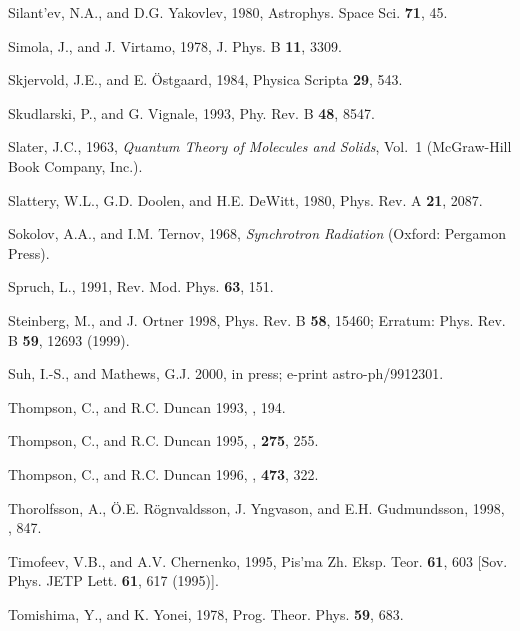 \begin{references}

\harvarditem{}{}{}
Silant'ev, N.A., and D.G. Yakovlev, 1980, Astrophys. Space Sci. {\bf 71}, 45.

\harvarditem{}{}{}
Simola, J., and J. Virtamo, 1978, J. Phys. B {\bf 11}, 3309.

\harvarditem{}{}{}
Skjervold, J.E., and E. \"Ostgaard, 1984, Physica Scripta {\bf 29}, 543.

\harvarditem{}{}{}
Skudlarski, P., and G. Vignale, 1993, Phy. Rev. B {\bf 48}, 8547.

\harvarditem{}{}{}
Slater, J.C., 1963, {\it Quantum Theory of Molecules and Solids}, Vol.~1
(McGraw-Hill Book Company, Inc.).

\harvarditem{}{}{}
Slattery, W.L., G.D. Doolen, and H.E. DeWitt, 1980, Phys. Rev. A {\bf 21}, 
2087.

\harvarditem{}{}{}
Sokolov, A.A., and I.M. Ternov, 1968, {\it Synchrotron Radiation}
(Oxford: Pergamon Press).

\harvarditem{}{}{}
Spruch, L., 1991, Rev. Mod. Phys. {\bf 63}, 151.

\harvarditem{}{}{}
Steinberg, M., and J. Ortner 1998, Phys. Rev. B {\bf 58}, 15460; Erratum:
Phys. Rev. B {\bf 59}, 12693 (1999).

\harvarditem{}{}{}
Suh, I.-S., and Mathews, G.J. 2000, \apj in press; e-print 
astro-ph/9912301.

\harvarditem{}{}{}
Thompson, C., and R.C. Duncan 1993, , 194.

\harvarditem{}{}{}
Thompson, C., and R.C. Duncan 1995, \mnras, {\bf 275}, 255.

\harvarditem{}{}{}
Thompson, C., and R.C. Duncan 1996, \apj, {\bf 473}, 322.

\harvarditem{}{}{}
Thorolfsson, A., \"O.E. R\"ognvaldsson, J. Yngvason, and E.H. Gudmundsson,
1998, , 847.

\harvarditem{}{}{}
Timofeev, V.B., and A.V. Chernenko, 1995, Pis'ma Zh. Eksp. Teor. {\bf 61}, 
603 [Sov. Phys. JETP Lett. {\bf 61}, 617 (1995)]. 

\harvarditem{}{}{}
Tomishima, Y., and K. Yonei, 1978, Prog. Theor. Phys. {\bf 59}, 683.


\end{references}
